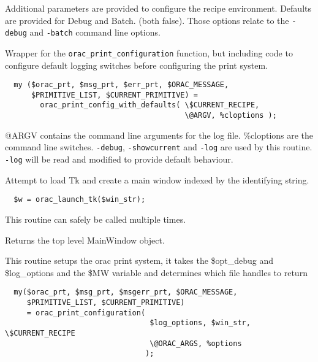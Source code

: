 \begin{description}
Additional parameters are provided to configure the recipe
environment. Defaults are provided for Debug and Batch.
(both false). Those options relate to the \texttt{-debug} and \texttt{-batch}
command line options.


\item[{\textbf{orac\_print\_config\_with\_defaults}}] \mbox{}

Wrapper for the \texttt{orac\_print\_configuration} function, but including
code to configure default logging switches before configuring the
print system.

\begin{verbatim}
  my ($orac_prt, $msg_prt, $err_prt, $ORAC_MESSAGE,
      $PRIMITIVE_LIST, $CURRENT_PRIMITIVE) =
        orac_print_config_with_defaults( \$CURRENT_RECIPE,
                                         \@ARGV, %cloptions );
\end{verbatim}


@ARGV contains the command line arguments for the log file. \%cloptions
are the command line switches. \texttt{-debug}, \texttt{-showcurrent} and \texttt{-log}
are used by this routine. \texttt{-log} will be read and modified to provide
default behaviour.


\item[{\textbf{orac\_launch\_tk}}] \mbox{}

Attempt to load Tk and create a main window indexed by the identifying
string.

\begin{verbatim}
  $w = orac_launch_tk($win_str);
\end{verbatim}


This routine can safely be called multiple times.



Returns the top level MainWindow object.


\item[{\textbf{orac\_print\_configuration}}] \mbox{}

This routine setups the orac print system, it takes the \$opt\_debug and
\$log\_options and the \$MW variable and determines which file handles to return

\begin{verbatim}
  my($orac_prt, $msg_prt, $msgerr_prt, $ORAC_MESSAGE,
     $PRIMITIVE_LIST, $CURRENT_PRIMITIVE)    
     = orac_print_configuration( 
                                 $log_options, $win_str, \$CURRENT_RECIPE 
                                 \@ORAC_ARGS, %options
                                );
\end{verbatim}



\end{description}
